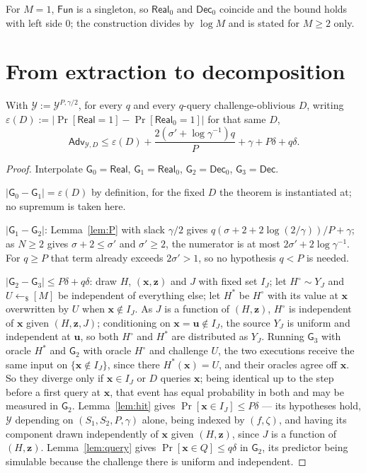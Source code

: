 \documentclass{aicr-solution}
\newcommand{\Fun}{\mathsf{Fun}}
\newcommand{\Adv}{\mathsf{Adv}}
\newcommand{\Real}{\mathsf{Real}}
\newcommand{\Dec}{\mathsf{Dec}}
\newcommand{\Prob}[1]{\Pr\!\left[#1\right]}
\newcommand{\vx}{\mathbf{x}}
\newcommand{\vz}{\mathbf{z}}
\newcommand{\vu}{\mathbf{u}}
\begin{document}
For $M = 1$, $\Fun$ is a singleton, so $\Real_0$ and $\Dec_0$ coincide and the
bound holds with left side $0$; the construction divides by $\log M$ and is stated
for $M \ge 2$ only.

\section{From extraction to decomposition}\label{sec:decomposition}

\begin{theorem}\label{thm:C}
With $\mathcal{Y} := \mathcal{Y}^{P,\gamma/2}$, for every $q$ and every $q$-query
challenge-oblivious $D$, writing
$\varepsilon(D) := |\Prob{\Real = 1} - \Prob{\Real_0 = 1}|$ for that same $D$,
\[
  \Adv_{\mathcal{Y},D} \le \varepsilon(D)
  + \frac{2(\sigma' + \log\gamma^{-1})q}{P} + \gamma + P\delta + q\delta .
\]
\end{theorem}

\begin{proof}
Interpolate $\mathsf{G}_0 = \Real$, $\mathsf{G}_1 = \Real_0$,
$\mathsf{G}_2 = \Dec_0$, $\mathsf{G}_3 = \Dec$.

$|\mathsf{G}_0 - \mathsf{G}_1| = \varepsilon(D)$ by definition, for the fixed $D$
the theorem is instantiated at; no supremum is taken here.

$|\mathsf{G}_1 - \mathsf{G}_2|$: Lemma~\ref{lem:P} with slack $\gamma/2$ gives
$q(\sigma + 2 + 2\log(2/\gamma))/P + \gamma$; as $N \ge 2$ gives
$\sigma + 2 \le \sigma'$ and $\sigma' \ge 2$, the numerator is at most
$2\sigma' + 2\log\gamma^{-1}$. For $q \ge P$ that term already exceeds
$2\sigma' > 1$, so no hypothesis $q < P$ is needed.

$|\mathsf{G}_2 - \mathsf{G}_3| \le P\delta + q\delta$: draw $H$, $(\vx,\vz)$ and
$J$ with fixed set $I_J$; let $H^{\circ} \sim Y_J$ and $U \gets_{\$} [M]$ be
independent of everything else; let $H^{*}$ be $H^{\circ}$ with its value at $\vx$
overwritten by $U$ when $\vx \notin I_J$. As $J$ is a function of $(H,\vz)$,
$H^{\circ}$ is independent of $\vx$ given $(H,\vz,J)$; conditioning on
$\vx = \vu \notin I_J$, the source $Y_J$ is uniform and independent at $\vu$, so
both $H^{\circ}$ and $H^{*}$ are distributed as $Y_J$. Running $\mathsf{G}_3$ with
oracle $H^{*}$ and $\mathsf{G}_2$ with oracle $H^{\circ}$ and challenge $U$, the
two executions receive the same input on $\{\vx \notin I_J\}$, since there
$H^{*}(\vx) = U$, and their oracles agree off $\vx$. So they diverge only if
$\vx \in I_J$ or $D$ queries $\vx$; being identical up to the step before a first
query at $\vx$, that event has equal probability in both and may be measured in
$\mathsf{G}_2$. Lemma~\ref{lem:hit} gives $\Prob{\vx \in I_J} \le P\delta$ --- its
hypotheses hold, $\mathcal{Y}$ depending on $(S_1,S_2,P,\gamma)$ alone, being
indexed by $(f,\zeta)$, and having its component drawn independently of $\vx$ given
$(H,\vz)$, since $J$ is a function of $(H,\vz)$. Lemma~\ref{lem:query} gives
$\Prob{\vx \in Q} \le q\delta$ in $\mathsf{G}_2$, its predictor being simulable
because the challenge there is uniform and independent.
\end{proof}
\end{document}
